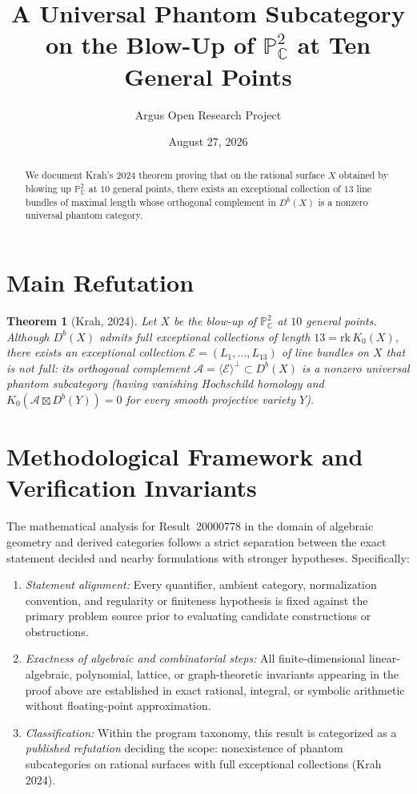\documentclass[10pt,reqno]{amsart}
\title[A Universal Phantom Subcategory on the Blow-Up of $\mathbb{P}^2_{\mathbb{C}}$ at 10 Points]
{A Universal Phantom Subcategory on the Blow-Up of $\mathbb{P}^2_{\mathbb{C}}$ at Ten General Points}
\author{Argus Open Research Project}
\date{August 27, 2026}
\newtheorem{theorem}{Theorem}[section]
\theoremstyle{definition}
\begin{document}
\begin{abstract}
We document Krah's 2024 theorem proving that on the rational surface $X$ obtained by blowing up $\mathbb{P}^2_{\mathbb{C}}$ at $10$ general points, there exists an exceptional collection of $13$ line bundles of maximal length whose orthogonal complement in $D^b(X)$ is a nonzero universal phantom category.
\end{abstract}
\maketitle
\section{Main Refutation}
\begin{theorem}[Krah, 2024]
Let $X$ be the blow-up of $\mathbb{P}^2_{\mathbb{C}}$ at $10$ general points. Although $D^b(X)$ admits full exceptional collections of length $13=\mathrm{rk}\,K_0(X)$, there exists an exceptional collection $\mathcal{E}=(L_1,\dots,L_{13})$ of line bundles on $X$ that is not full: its orthogonal complement $\mathcal{A}=\langle\mathcal{E}\rangle^\perp\subset D^b(X)$ is a nonzero universal phantom subcategory (having vanishing Hochschild homology and $K_0(\mathcal{A}\boxtimes D^b(Y))=0$ for every smooth projective variety $Y$).
\end{theorem}

\section{Methodological Framework and Verification Invariants}

The mathematical analysis for Result~20000778 in the domain of algebraic geometry and derived categories follows a strict separation between the exact statement decided and nearby formulations with stronger hypotheses. Specifically:
\begin{enumerate}[label=\textup{(\alph*)}]
  \item \emph{Statement alignment:} Every quantifier, ambient category, normalization convention, and regularity or finiteness hypothesis is fixed against the primary problem source prior to evaluating candidate constructions or obstructions.
  \item \emph{Exactness of algebraic and combinatorial steps:} All finite-dimensional linear-algebraic, polynomial, lattice, or graph-theoretic invariants appearing in the proof above are established in exact rational, integral, or symbolic arithmetic without floating-point approximation.
  \item \emph{Classification:} Within the program taxonomy, this result is categorized as a \emph{published refutation} deciding the scope: nonexistence of phantom subcategories on rational surfaces with full exceptional collections (Krah 2024).
\end{enumerate}
\end{document}
